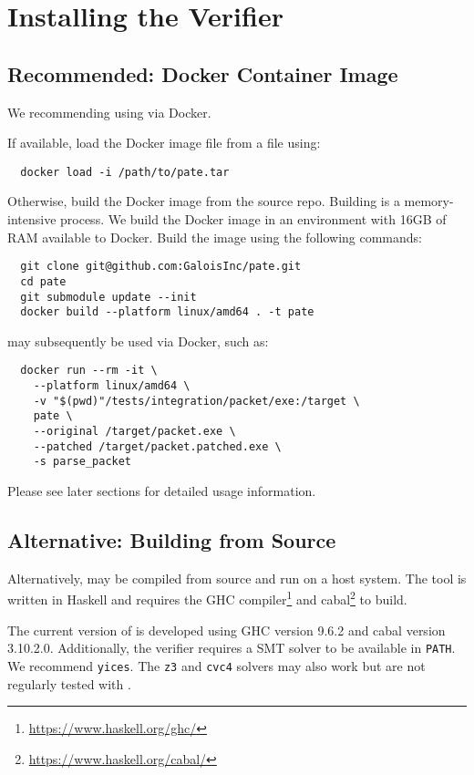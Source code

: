 \section{Installing the \pate{} Verifier}
\label{sec:build-pate-verif}

\subsection{Recommended: Docker Container Image}

We recommending using \pate{} via Docker.

If available, load the Docker image file from a file using:
\begin{verbatim}
  docker load -i /path/to/pate.tar
\end{verbatim}

Otherwise, build the Docker image from the \pate{} source repo.
Building \pate{} is a memory-intensive process.
We build the Docker image in an environment with 16GB of RAM available to Docker.
Build the image using the following commands:

\begin{verbatim}
  git clone git@github.com:GaloisInc/pate.git
  cd pate
  git submodule update --init
  docker build --platform linux/amd64 . -t pate
\end{verbatim}

\pate{} may subsequently be used via Docker, such as:

\begin{verbatim}
  docker run --rm -it \
    --platform linux/amd64 \
    -v "$(pwd)"/tests/integration/packet/exe:/target \
    pate \
    --original /target/packet.exe \
    --patched /target/packet.patched.exe \
    -s parse_packet
\end{verbatim}

Please see later sections for detailed usage information.

\subsection{Alternative: Building from Source}

Alternatively, \pate{} may be compiled from source and run on a host system.
The \pate{} tool is written in Haskell and requires the GHC compiler\footnote{\url{https://www.haskell.org/ghc/}} and cabal\footnote{\url{https://www.haskell.org/cabal/}} to build.

The current version of \pate{} is developed using GHC version 9.6.2 and cabal version 3.10.2.0.
Additionally, the verifier requires a SMT solver to be available in \texttt{PATH}.
We recommend \texttt{yices}.
The \texttt{z3} and \texttt{cvc4} solvers may also work but are not regularly tested with \pate{}.

